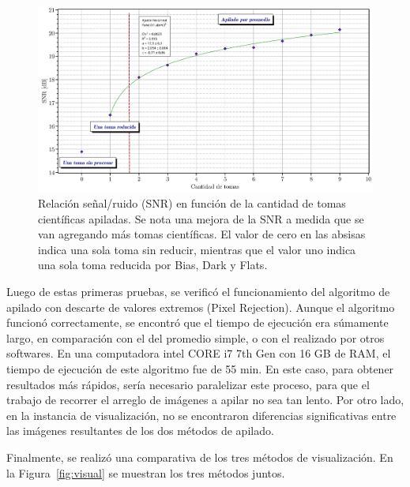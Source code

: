 \documentclass[a4paper, 12pt]{article}
\begin{document}
\begin{figure}[!h]
  \centering
  \includegraphics[width=\textwidth]{img/SNR.pdf}
  \caption{\label{fig:snr} Relación señal/ruido (SNR) en función de la cantidad de tomas científicas apiladas. Se nota una mejora de la SNR a medida que se van agregando más tomas científicas. El valor de cero en las absisas indica una sola toma sin reducir, mientras que el valor uno indica una sola toma reducida por Bias, Dark y Flats.}
\end{figure}


Luego de estas primeras pruebas, se verificó el funcionamiento del algoritmo de apilado con descarte de valores extremos (Pixel Rejection). Aunque el algoritmo funcionó correctamente, se encontró que el tiempo de ejecución era súmamente largo, en comparación con el del promedio simple, o con el realizado por otros softwares. En una computadora {\sf intel CORE i7 7th Gen} con 16 GB de RAM, el tiempo de ejecución de este algoritmo fue de 55 min. En este caso, para obtener resultados más rápidos, sería necesario paralelizar este proceso, para que el trabajo de recorrer el arreglo de imágenes a apilar no sea tan lento. Por otro lado, en la instancia de visualización, no se encontraron diferencias significativas entre las imágenes resultantes de los dos métodos de apilado.

Finalmente, se realizó una comparativa de los tres métodos de visualización. En la Figura~\ref{fig:visual} se muestran los tres métodos juntos. 
\end{document}

